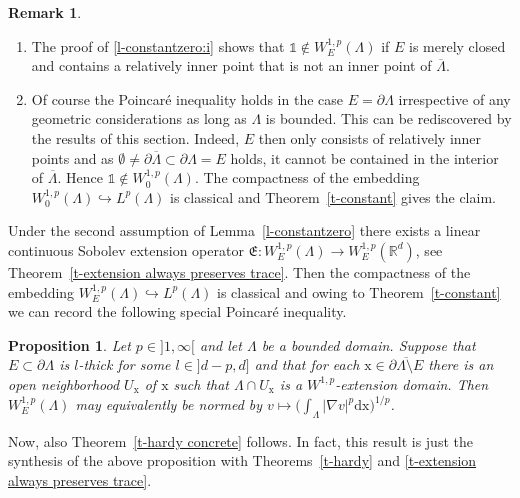 \documentclass[10pt,leqno]{amsart}
\newtheorem{proposition}[theorem]{Proposition}
\theoremstyle{definition}
\newtheorem{remark}[theorem]{Remark}
\numberwithin{equation}{section}
\begin{document}
\begin{remark} \label{r-explain}
\begin{enumerate}
 \item The proof of \ref{l-constantzero:i} shows that $\mathds 1 \notin
  W_E^{1,p}(\Lambda)$ if $E$ is merely closed and contains a relatively inner
  point that is not an inner point of $\overline{\Lambda}$.
 \item Of course the Poincar\'{e} inequality holds in the case $E =\partial
 \Lambda$ irrespective of any geometric considerations as long as $\Lambda$ is
 bounded. This can be rediscovered by the results of this section.
 Indeed, $E$ then only consists of relatively inner points and as
 $\emptyset \neq \partial \overline{\Lambda}   \subset \partial \Lambda = E$
 holds,
 it cannot be contained in the interior of $\overline{\Lambda}$. Hence
 $\mathds{1} \notin W_0^{1,p}(\Lambda)$. The  compactness of the embedding
 $W_0^{1,p}(\Lambda) \hookrightarrow  L^p(\Lambda)$ is classical and
 Theorem~\ref{t-constant} gives the claim.
\end{enumerate}
\end{remark}

Under the second assumption of Lemma~\ref{l-constantzero} there exists
a linear continuous Sobolev extension operator $\mathfrak{E}: W_E^{1,p}(\Lambda)
\to W_E^{1,p}({{\mathbb R}}^d)$, see Theorem~\ref{t-extension always preserves trace}. Then
the compactness of the embedding $W_E^{1,p}(\Lambda) \hookrightarrow
L^p(\Lambda)$ is classical and owing to Theorem~\ref{t-constant} we can record
the following special Poincar\'{e} inequality.

\begin{proposition} \label{p-concrete_poincare}
Let $p \in {]1,\infty[}$ and let $\Lambda$ be a bounded domain. Suppose that $E
\subset \partial \Lambda$ is $l$-thick for some $l \in {]d-p,d]}$ and that for
each ${{\mathrm x}} \in \overline{\partial \Lambda \setminus E}$ there is an open
neighborhood $U_{{\mathrm x}}$ of $ {{\mathrm x}}$ such that $\Lambda \cap U_\mathrm x$ is a
$W^{1,p}$-extension domain. Then $W_E^{1,p}(\Lambda)$ may equivalently be normed
by $v \mapsto \bigl( \int_\Lambda |\nabla v|^p \mathrm{d} {{\mathrm x}} \bigr)^{1/p}$.
\end{proposition}

Now, also Theorem~\ref{t-hardy concrete} follows. In fact, this result is just
the synthesis of the above proposition with Theorems~\ref{t-hardy} and
\ref{t-extension always preserves trace}.
\end{document}

